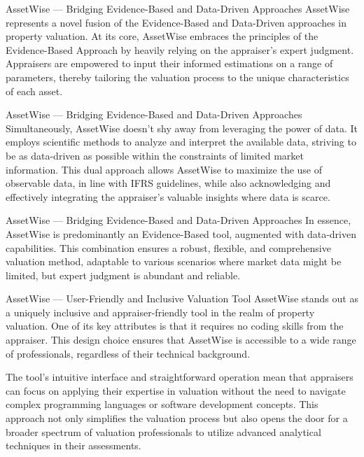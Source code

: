 \documentclass{beamer}
\begin{document}
\begin{frame}{AssetWise --- Bridging Evidence-Based and Data-Driven Approaches}
	AssetWise represents a novel fusion of the Evidence-Based and Data-Driven approaches in property valuation. At its core, AssetWise embraces the principles of the Evidence-Based Approach by heavily relying on the appraiser's expert judgment. Appraisers are empowered to input their informed estimations on a range of parameters, thereby tailoring the valuation process to the unique characteristics of each asset.
\end{frame}

\begin{frame}{AssetWise --- Bridging Evidence-Based and Data-Driven Approaches}
	Simultaneously, AssetWise doesn't shy away from leveraging the power of data. It employs scientific methods to analyze and interpret the available data, striving to be as data-driven as possible within the constraints of limited market information. This dual approach allows AssetWise to maximize the use of observable data, in line with IFRS guidelines, while also acknowledging and effectively integrating the appraiser's valuable insights where data is scarce.
\end{frame}

\begin{frame}{AssetWise --- Bridging Evidence-Based and Data-Driven Approaches}
	In essence, AssetWise is predominantly an Evidence-Based tool, augmented with data-driven capabilities. This combination ensures a robust, flexible, and comprehensive valuation method, adaptable to various scenarios where market data might be limited, but expert judgment is abundant and reliable.
\end{frame}

\begin{frame}{AssetWise --- User-Friendly and Inclusive Valuation Tool}
	AssetWise stands out as a uniquely inclusive and appraiser-friendly tool in the realm of property valuation. One of its key attributes is that it requires no coding skills from the appraiser. This design choice ensures that AssetWise is accessible to a wide range of professionals, regardless of their technical background.
	
	The tool's intuitive interface and straightforward operation mean that appraisers can focus on applying their expertise in valuation without the need to navigate complex programming languages or software development concepts. This approach not only simplifies the valuation process but also opens the door for a broader spectrum of valuation professionals to utilize advanced analytical techniques in their assessments.
\end{frame}
\end{document}
